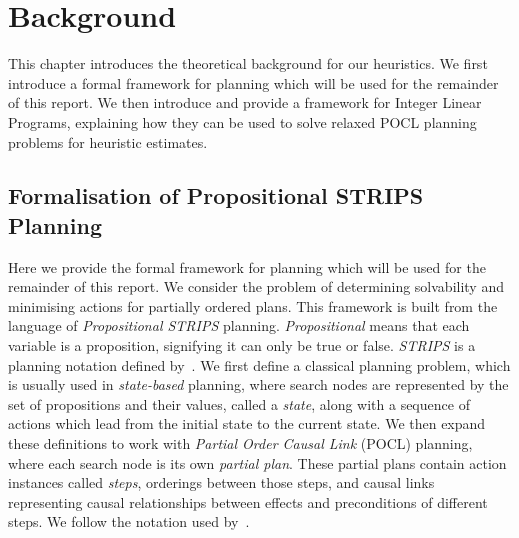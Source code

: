 \chapter{Background}\label{chap:background}

This chapter introduces the theoretical background for our heuristics. We first introduce a formal framework for planning which will be used for the remainder of this report. We then introduce and provide a framework for Integer Linear Programs, explaining how they can be used to solve relaxed POCL planning problems for heuristic estimates.\\


\section{Formalisation of Propositional STRIPS Planning}

Here we provide the formal framework for planning which will be used for the remainder of this report. We consider the problem of determining solvability and minimising actions for partially ordered plans. This framework is built from the language of \textit{Propositional STRIPS} planning. \textit{Propositional} means that each variable is a proposition, signifying it can only be true or false. \textit{STRIPS} is a planning notation defined by~\cite{Fikes1971STRIPS}. We first define a classical planning problem, which is usually used in \textit{state-based} planning, where search nodes are represented by the set of propositions and their values, called a \textit{state}, along with a sequence of actions which lead from the initial state to the current state. We then expand these definitions to work with \textit{Partial Order Causal Link} (POCL) planning, where each search node is its own \textit{partial plan}. These partial plans contain action instances called \textit{steps}, orderings between those steps, and causal links representing causal relationships between effects and preconditions of different steps. We follow the notation used by~\cite{Bercher2020POPvsPOCL}.\\


